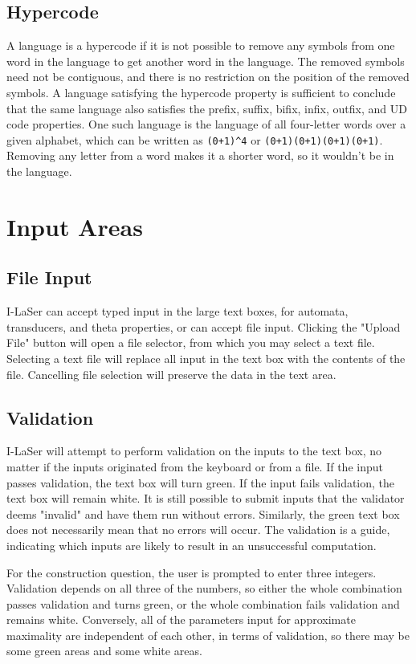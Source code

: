 \documentclass{article}
\begin{document}
\subsection{Hypercode}
A language is a hypercode if it is not possible to remove any symbols from one word in the language to get another word in the language. The removed symbols need not be contiguous, and there is no restriction on the position of the removed symbols. A language satisfying the hypercode property is sufficient to conclude that the same language also satisfies the prefix, suffix, bifix, infix, outfix, and UD code properties. One such language is the language of all four-letter words over a given alphabet, which can be written as \verb-(0+1)^4- or \verb-(0+1)(0+1)(0+1)(0+1)-. Removing any letter from a word makes it a shorter word, so it wouldn't be in the language. 

\section{Input Areas}

\subsection{File Input}
I-LaSer can accept typed input in the large text boxes, for automata, transducers, and theta properties, or can accept file input. Clicking the "Upload File" button will open a file selector, from which you may select a text file. Selecting a text file will replace all input in the text box with the contents of the file. Cancelling file selection will preserve the data in the text area.

\subsection{Validation}
I-LaSer will attempt to perform validation on the inputs to the text box, no matter if the inputs originated from the keyboard or from a file. If the input passes validation, the text box will turn green. If the input fails validation, the text box will remain white. It is still possible to submit inputs that the validator deems "invalid" and have them run without errors. Similarly, the green text box does not necessarily mean that no errors will occur. 
The validation is a guide, indicating which inputs are likely to result in an unsuccessful computation.
\par For the construction question, the user is prompted to enter three integers. Validation depends on all three of the numbers, so either the whole combination passes validation and turns green, or the whole combination fails validation and remains white.
Conversely, all of the parameters input for approximate maximality are independent of each other, in terms of validation, so there may be some green areas and some white areas.
\end{document}
